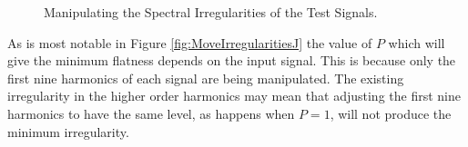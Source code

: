 			\begin{figure}[h!]
				\centering
				\qquad
				
				\caption{Manipulating the Spectral Irregularities of the Test Signals.}
				\label{fig:MoveIrregularities}
			\end{figure}

			As is most notable in Figure \ref{fig:MoveIrregularitiesJ} the value of $P$ which will give the
			minimum flatness depends on the input signal. This is because only the first nine harmonics of each
			signal are being manipulated. The existing irregularity in the higher order harmonics may mean that
			adjusting the first nine harmonics to have the same level, as happens when $P = 1$, will not
			produce the minimum irregularity.

